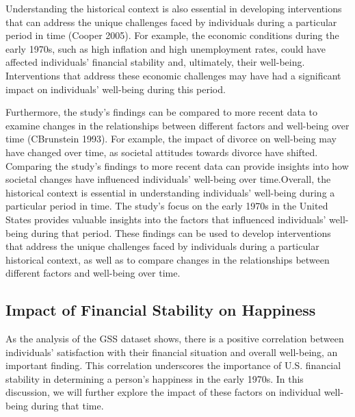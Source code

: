 \documentclass[
  letterpaper,
  DIV=11,
  numbers=noendperiod]{scrartcl}
\begin{document}
Understanding the historical context is also essential in developing
interventions that can address the unique challenges faced by
individuals during a particular period in time (Cooper 2005). For
example, the economic conditions during the early 1970s, such as high
inflation and high unemployment rates, could have affected individuals'
financial stability and, ultimately, their well-being. Interventions
that address these economic challenges may have had a significant impact
on individuals' well-being during this period.

Furthermore, the study's findings can be compared to more recent data to
examine changes in the relationships between different factors and
well-being over time (CBrunstein 1993). For example, the impact of
divorce on well-being may have changed over time, as societal attitudes
towards divorce have shifted. Comparing the study's findings to more
recent data can provide insights into how societal changes have
influenced individuals' well-being over time.Overall, the historical
context is essential in understanding individuals' well-being during a
particular period in time. The study's focus on the early 1970s in the
United States provides valuable insights into the factors that
influenced individuals' well-being during that period. These findings
can be used to develop interventions that address the unique challenges
faced by individuals during a particular historical context, as well as
to compare changes in the relationships between different factors and
well-being over time.

\hypertarget{impact-of-financial-stability-on-happiness}{%
\subsection{Impact of Financial Stability on
Happiness}\label{impact-of-financial-stability-on-happiness}}

As the analysis of the GSS dataset shows, there is a positive
correlation between individuals' satisfaction with their financial
situation and overall well-being, an important finding. This correlation
underscores the importance of U.S. financial stability in determining a
person's happiness in the early 1970s. In this discussion, we will
further explore the impact of these factors on individual well-being
during that time.
\end{document}
